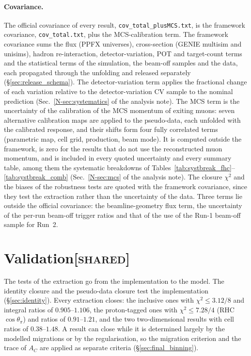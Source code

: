\documentclass[11pt,a4paper]{article}
\newcommand{\noteref}[2]{#1~\ref{N-#2} of the analysis note}
\newcommand{\scopetag}[1]{\hfill{\normalfont\small\textsc{[#1]}}}
\begin{document}
\paragraph{Covariance.} The official covariance of every result, \texttt{cov\_total\_plusMCS.txt}, is
the framework covariance, \texttt{cov\_total.txt}, plus the MCS-calibration term. The framework
covariance sums the flux (PPFX universes), cross-section (GENIE multisim and unisims), hadron
re-interaction, detector-variation, POT and target-count terms and the statistical terms of the
simulation, the beam-off samples and the data, each propagated through the unfolding and released
separately (\S\ref{sec:release_schema}). The detector-variation term applies the fractional change of each variation
relative to the detector-variation CV sample to the nominal prediction (\noteref{Sec.}{sec:systematics}). The MCS term is the uncertainty of the calibration of
the MCS momentum of exiting muons: seven alternative calibration maps are applied to the pseudo-data, each unfolded
with the calibrated response, and their shifts form four fully correlated terms (parametric map, cell grid,
production, beam mode). It is computed outside the
framework, is zero for the results that do not use the reconstructed muon momentum, and is
included in every quoted uncertainty and every summary table, among them the systematic breakdowns of
Tables~\ref{tab:systbreak_fhc}--\ref{tab:systbreak_comb} (\noteref{Sec.}{sec:mcs}). The closure
$\chi^2$ and the biases of the robustness tests are quoted with the framework covariance, since they
test the extraction rather than the uncertainty of the data. Three terms lie outside the official
covariance: the beamline-geometry flux term, the uncertainty of the per-run beam-off trigger ratios and that of the use of the Run-1 beam-off
sample for Run~2.

\section[Validation]{Validation\scopetag{shared}}
\label{sec:supp_validation}

The tests of the extraction go from the implementation to the model. The identity closure and the
pseudo-data closure test the implementation (\S\ref{sec:identity}). Every extraction closes: the
inclusive ones with $\chi^2\le3.12/8$ and integral ratios of $0.905$--$1.106$, the proton-tagged ones
with $\chi^2\le7.28/4$ (RHC $\cos\theta_\pi$) and ratios of $0.91$--$1.21$, and the two two-dimensional
results with cell ratios of $0.38$--$1.48$. A result can close while it is determined largely by the
modelled migrations or by the regularisation, so the migration criterion and the trace of $A_C$ are
applied as separate criteria (\S\ref{sec:final_binning}).
\end{document}
